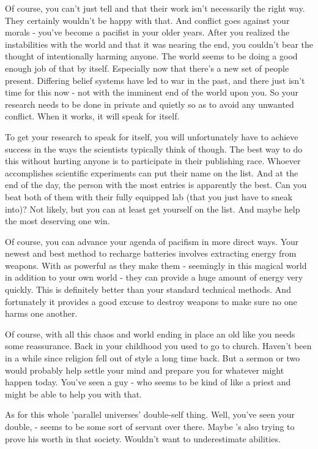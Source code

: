\documentclass[char]{guildcamp3}
\begin{document}
Of course, you can't just tell \cSciOne{\informal} and \cSciTwo{\informal} that their work isn't necessarily the right way. They certainly wouldn't be happy with that. And conflict goes against your morals - you've become a pacifist in your older years. After you realized the instabilities with the world and that it was nearing the end, you couldn't bear the thought of intentionally harming anyone. The world seems to be doing a good enough job of that by itself. Especially now that there's a new set of people present. Differing belief systems have led to war in the past, and there just isn't time for this now - not with the imminent end of the world upon you. So your research needs to be done in private and quietly so as to avoid any unwanted conflict. When it works, it will speak for itself. 

To get your research to speak for itself, you will unfortunately have to achieve success in the ways the scientists typically think of though. The best way to do this without hurting anyone is to participate in their publishing race. Whoever accomplishes scientific experiments can put their name on the list. And at the end of the day, the person with the most entries is apparently the best. Can you beat both of them with their fully equipped lab (that you just have to sneak into)? Not likely, but you can at least get yourself on the list. And maybe help the most deserving one win.

Of course, you can advance your agenda of pacifism in more direct ways. Your newest and best method to recharge batteries involves extracting energy from weapons. With as powerful as they make them - seemingly in this magical world in addition to your own world - they can provide a huge amount of energy very quickly. This is definitely better than your standard technical methods. And fortunately it provides a good excuse to destroy weapons to make sure no one harms one another.

Of course, with all this chaos and world ending in place an old \cTech{\human} like you needs some reassurance. Back in your childhood you used to go to church. Haven't been in a while since religion fell out of style a long time back. But a sermon or two would probably help settle your mind and prepare you for whatever might happen today. You've seen a guy - \cPaladin{\intro} who seems to be kind of like a priest and might be able to help you with that. 

As for this whole 'parallel universes' double-self thing. Well, you've seen your double, \cServant{\intro} - seems to be some sort of servant over there. Maybe \cServant{\they}'s also trying to prove his worth in that society. Wouldn't want to underestimate \cServant{\their} abilities.
\end{document}
